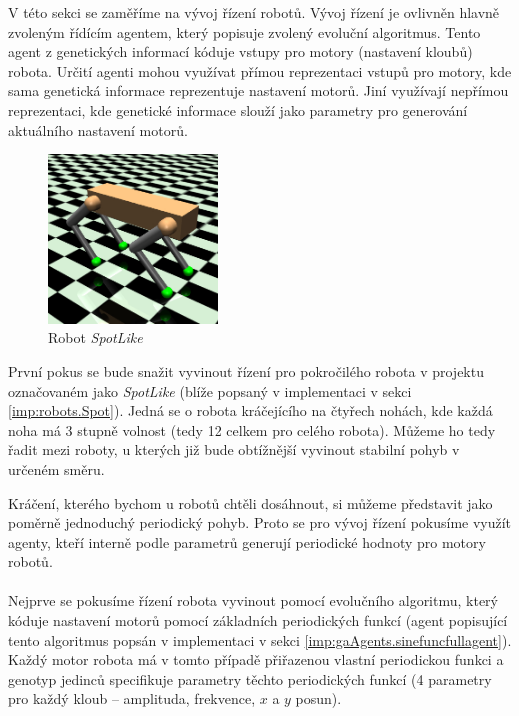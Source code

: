 \pagebreak
V této sekci se zaměříme na vývoj řízení robotů. Vývoj řízení je ovlivněn
hlavně zvoleným řídícím agentem, který popisuje zvolený evoluční algoritmus.
Tento agent z genetických informací kóduje vstupy pro motory (nastavení kloubů)
robota. Určití agenti mohou využívat přímou reprezentaci vstupů pro motory, kde
sama genetická informace reprezentuje nastavení motorů. Jiní využívají nepřímou
reprezentaci, kde genetické informace slouží jako parametry pro generování
aktuálního nastavení motorů.

\begin{figure}[!htb]
    \centering
    \includegraphics[width=0.4\textwidth]{../img/crop_SpotLike.jpg}
    \caption{Robot \emph{SpotLike}}
    \label{fig:robot:spotlike}
\end{figure}

První pokus se bude snažit vyvinout řízení pro pokročilého robota v projektu
označovaném jako \emph{SpotLike} (blíže popsaný v implementaci v sekci
\ref{imp:robots.Spot}). Jedná se o robota kráčejícího na čtyřech nohách, kde každá
noha má 3 stupně volnost (tedy 12 celkem pro celého robota). Můžeme ho tedy
řadit mezi roboty, u kterých již bude obtížnější vyvinout stabilní pohyb v
určeném směru.

Kráčení, kterého bychom u robotů chtěli dosáhnout, si můžeme představit jako
poměrně jednoduchý periodický pohyb. Proto se pro vývoj řízení pokusíme využít
agenty, kteří interně podle parametrů generují periodické hodnoty pro motory
robotů. 

\paragraph{}
Nejprve se pokusíme řízení robota vyvinout pomocí evolučního
algoritmu, který kóduje nastavení motorů pomocí základních periodických funkcí
(agent popisující tento algoritmus popsán v implementaci v sekci
\ref{imp:gaAgents.sinefuncfullagent}). Každý motor robota má v tomto případě
přiřazenou vlastní periodickou funkci a genotyp jedinců specifikuje parametry
těchto periodických funkcí (4 parametry pro každý kloub -- amplituda,
frekvence, $x$ a $y$ posun).

